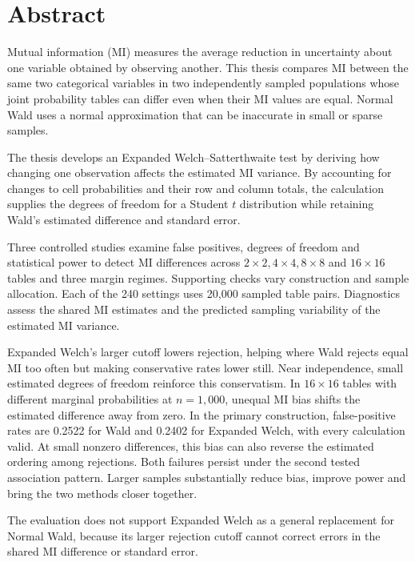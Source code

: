 \chapter*{Abstract}

Mutual information (MI) measures the average reduction in uncertainty about
one variable obtained by observing another.
This thesis compares MI between the same two categorical variables in
two independently sampled populations whose joint probability tables
can differ even when their MI values are equal. Normal Wald uses a normal
approximation that can be inaccurate in small or sparse samples.

The thesis develops an Expanded Welch--Satterthwaite test by
deriving how changing one observation affects the estimated MI variance.
By accounting for changes to cell probabilities and their row and
column totals, the calculation supplies the degrees of freedom for a
Student \(t\) distribution while retaining Wald's estimated difference
and standard error.

Three controlled studies examine false positives, degrees of freedom and
statistical power to detect MI differences across \(2\times2,4\times4,8\times8\) and
\(16\times16\) tables and three margin regimes. Supporting checks
vary construction and sample allocation. Each of the 240 settings uses
20,000 sampled table pairs. Diagnostics assess the shared MI estimates
and the predicted sampling variability of the estimated MI variance.

Expanded Welch's larger cutoff lowers rejection, helping where Wald rejects
equal MI too often but making conservative rates lower still. Near independence,
small estimated degrees of freedom reinforce this conservatism. In
\(16\times16\) tables with different marginal probabilities at
\(n=1{,}000\), unequal MI bias shifts the estimated difference away
from zero. In the primary construction, false-positive rates are
0.2522 for Wald and 0.2402 for Expanded Welch, with every calculation
valid. At small nonzero differences, this bias can also reverse the
estimated ordering among rejections. Both failures persist under the
second tested association pattern. Larger samples substantially reduce
bias, improve power and bring the two methods closer together.

The evaluation does not support Expanded Welch as a general replacement
for Normal Wald, because its larger rejection cutoff cannot correct
errors in the shared MI difference or standard error.
